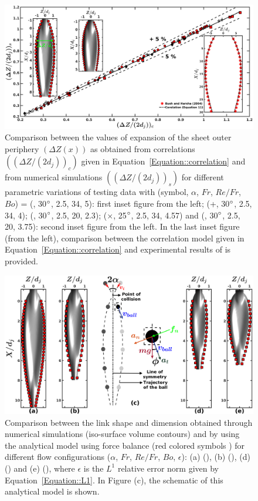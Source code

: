 \documentclass{jfm}
\begin{document}
\begin{figure}
	\centering
	\includegraphics[width=\linewidth]{corelatehx}
	\caption{Comparison between the values of expansion of the sheet outer periphery $\left(\Delta Z(x)\right)$ as obtained from correlations $\left((\Delta Z/(2d_j))_c\right)$ given in Equation~\ref{Equation::correlation} and from numerical simulations $\left((\Delta Z/(2d_j))_s\right)$ for different parametric variations of testing data with (symbol, $\alpha$, $Fr$, $Re/Fr$, $Bo$) = (\protect\MarkerSquareRed, 30$\degree$, 2.5, 34, 5): first inset figure from the left; (+, 30$\degree$, 2.5, 34, 4); (\protect \MarkerDiamondBlack, 30$\degree$, 2.5, 20, 2.3); ($\times$, 25$\degree$, 2.5, 34, 4.57) and (\protect \MarkerCircleRed, 30$\degree$, 2.5, 20, 3.75): second inset figure from the left. In the last inset figure (from the left), comparison between the  correlation model given in Equation~\ref{Equation::correlation} and experimental results of \cite{bush2004collision} is provided.}
	\label{Figure::corelatehx}
\end{figure}
\clearpage
\begin{figure}
	\centering
	\includegraphics[width=\linewidth]{analytical}
	\caption{Comparison between the link shape and dimension obtained through numerical simulations (iso-surface volume contours) and by using the analytical model using force balance (red colored symbols \protect\MarkerSquareRed) for different flow configurations ($\alpha$, $Fr$, $Re/Fr$, $Bo$, $\epsilon$): (a) (), (b) (), (d) () and (e) (), where $\epsilon$ is the $L^1$ relative error norm given by Equation~\ref{Equation::L1}. In Figure (c), the schematic of this analytical model is shown.}
	\label{Figure::analytical}
\end{figure}
\end{document}
